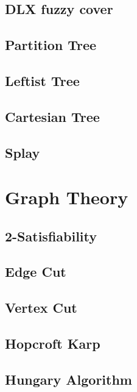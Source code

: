 \documentclass[a4paper,5pt,twocolumn,titlepage]{article}
\begin{document}
\begin{CJK*}{GBK}{song}
\subsection{DLX fuzzy cover}

\subsection{Partition Tree}

\subsection{Leftist Tree}

\subsection{Cartesian Tree}

\subsection{Splay}

\section{Graph Theory}
\subsection{2-Satisfiability}

\subsection{Edge Cut}

\subsection{Vertex Cut}

\subsection{Hopcroft Karp}

\subsection{Hungary Algorithm}


\end{CJK*}
\end{document}
